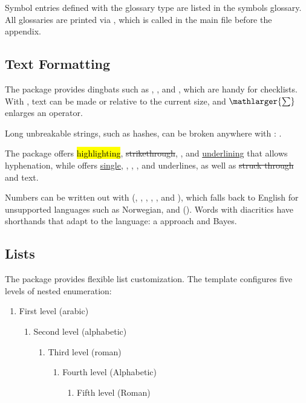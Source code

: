 Symbol entries defined with the  glossary type are listed in the symbols glossary. All glossaries are printed via \latexinline{\printglossaries}, which is called in the main file before the appendix.

\subsection{Text Formatting}

The  package provides dingbats such as , , and , which are handy for checklists. With , text can be made  or  relative to the current size, and $\mathlarger{\sum}$ enlarges an operator.

Long unbreakable strings, such as hashes, can be broken anywhere with : .

The  package offers \hl{highlighting}, \st{strikethrough}, , and \ul{underlining} that allows hyphenation, while  offers \uline{single}, , , , and  underlines, as well as \sout{struck through} and  text.

Numbers can be written out with  (, , , , , and ), which falls back to English for unsupported languages such as Norwegian, and \latexinline{\Romannumeral} (). Words with diacritics have shorthands that adapt to the language: a \naive approach and \Naive Bayes.

\subsection{Lists}

The  package provides flexible list customization. The template configures five levels of nested enumeration:

\begin{enumerate}
  \item First level (arabic)
  \begin{enumerate}
    \item Second level (alphabetic)
    \begin{enumerate}
      \item Third level (roman)
      \begin{enumerate}
        \item Fourth level (Alphabetic)
        \begin{enumerate}
          \item Fifth level (Roman)
        \end{enumerate}
      \end{enumerate}
    \end{enumerate}
  \end{enumerate}
\end{enumerate}

